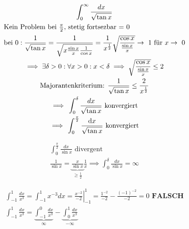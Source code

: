 \begin{bsp*}
	\begin{gather*}
		\int_0^\infty \frac{dx}{\sqrt{\tan x}} \\
		\intertext{Kein Problem bei $\frac{\pi}{2}$, stetig fortsezbar = 0}
		\text{bei } 0: \frac{1}{\sqrt{\tan x}} = \frac{1}{\sqrt{x \frac{\sin x}{x} \frac{1}{\cos x}}} = \frac{1}{x^{\frac{1}{2}}} \sqrt{ \frac{\cos x}{\frac{\sin x}{x}}} \rightarrow 1 \text{ für } x \rightarrow 0 \\
		\implies \exists \delta > 0 : \forall x > 0 : x < \delta \implies \sqrt{ \frac{\cos x}{\frac{\sin x}{x}}} \leq 2 \\
		\text{Majorantenkriterium: } \frac{1}{\sqrt{\tan x}} \leq \frac{2}{x^{\frac{1}{2}}} \\
		\implies \int_0^\delta \frac{dx}{\sqrt{\tan x}} \text{ konvergiert} \\
		\implies \int_0^{\frac{\pi}{2}} \frac{\dd x}{\sqrt{\tan x}} \text{ konvergiert}
	\end{gather*}
\end{bsp*}
\begin{bsp*}
	\begin{gather*}
		\int_0^{\frac{\pi}{2}} \frac{dx}{\sin x} \text{ divergent} \\
		\frac{1}{\sin x} = \underbrace{\frac{x}{\sin x}}_{\geq \frac{1}{2}} \frac{1}{x} \implies \int_0^\delta \frac{dx}{\sin x} = \infty
	\end{gather*}
\end{bsp*}
\begin{bsp*}
	\begin{gather*}
		\int_{-1}^1 \frac{dx}{x^3} = \int_{-1}^1 x^{-3} dx = \left. \frac{x^{-2}}{-2} \right|_{-1}^1 = \frac{1^{-2}}{-2} - \frac{(-1)^{-2}}{-2} = 0 \textbf{ FALSCH} \\
		\int_{-1}^1 \frac{dx}{x^3} = \underbrace{\int_{-1}^0 \frac{dx}{x^3}}_{\infty} - \underbrace{\int_0^1 \frac{dx}{x^3}}_{-\infty}
	\end{gather*}
\end{bsp*}

